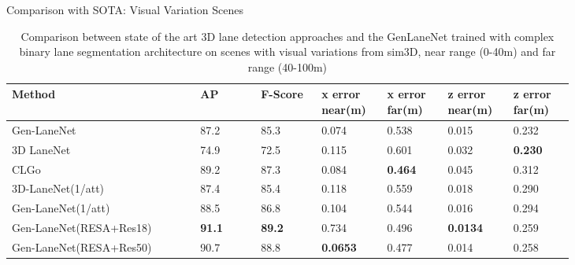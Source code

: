 \documentclass[aspectratio=169]{beamer}
\begin{document}
\begin{frame}{Comparison with SOTA: Visual Variation Scenes}
      \begin{table}[h]
      \small
    \centering
    \caption{Comparison between state of the art 3D lane detection approaches and the GenLaneNet  trained with complex binary lane segmentation architecture on scenes with visual variations from sim3D, near range (0-40m) and far range (40-100m)}
    \begin{tabular}{|p{0.29\linewidth}|p{0.09\linewidth}|p{0.09\linewidth}|p{0.09\linewidth}|p{0.09\linewidth}|p{0.09\linewidth}|p{0.09\linewidth}|}
    \hline
        \textbf{Method} & \textbf{AP} & \textbf{F-Score} & \textbf{x error near(m)} & \textbf{x error far(m)} & \textbf{z error near(m)} & \textbf{z error far(m)} \\ \hline
        Gen-LaneNet & 87.2 & 85.3 & 0.074 & 0.538 & 0.015 & 0.232 \\ \hline
        3D LaneNet & 74.9 & 72.5 & 0.115 & 0.601 & 0.032 & \textbf{0.230} \\ \hline
        CLGo & 89.2 & 87.3 & 0.084 & \textbf{0.464} & 0.045 & 0.312 \\ \hline
        3D-LaneNet(1/att) & 87.4 & 85.4 & 0.118 & 0.559 & 0.018 & 0.290 \\ \hline
        Gen-LaneNet(1/att) & 88.5 & 86.8 & 0.104 & 0.544 & 0.016 & 0.294 \\ \hline
        Gen-LaneNet(RESA+Res18) & \textbf{ 91.1} &\textbf{ 89.2} & 0.734 & 0.496 & \textbf{0.0134} & 0.259 \\ \hline
        Gen-LaneNet(RESA+Res50) & 90.7 & 88.8 & \textbf{0.0653} & 0.477 & 0.014 & 0.258 \\ \hline
    \end{tabular}
\end{table}
\end{frame}
\end{document}
